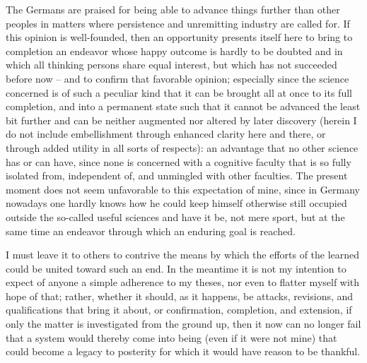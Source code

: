 The Germans are praised for being able to advance things further than
other peoples in matters where persistence and unremitting industry are
called for. If this opinion is well-founded, then an opportunity presents
itself here to bring to completion an endeavor whose happy outcome
is hardly to be doubted and in which all thinking persons share equal
interest, but which has not succeeded before now – and to conﬁrm that
favorable opinion; especially since the science concerned is of such a
peculiar kind that it can be brought all at once to its full completion, and
into a permanent state such that it cannot be advanced the least bit further
and can be neither augmented nor altered by later discovery (herein I
do not include embellishment through enhanced clarity here and there,
or through added utility in all sorts of respects): an advantage that no
other science has or can have, since none is concerned with a cognitive
faculty that is so fully isolated from, independent of, and unmingled
with other faculties. The present moment does not seem unfavorable to
this expectation of mine, since in Germany nowadays one hardly knows
how he could keep himself otherwise still occupied outside the so-called
useful sciences and have it be, not mere sport, but at the same time an
endeavor through which an enduring goal is reached.

I must leave it to others to contrive the means by which the efforts
of the learned could be united toward such an end. In the meantime
it is not my intention to expect of anyone a simple adherence to my
theses, nor even to ﬂatter myself with hope of that; rather, whether it
should, as it happens, be attacks, revisions, and qualiﬁcations that bring
it about, or conﬁrmation, completion, and extension, if only the matter
is investigated from the ground up, then it now can no longer fail that
a system would thereby come into being (even if it were not mine) that
could become a legacy to posterity for which it would have reason to be
thankful.

